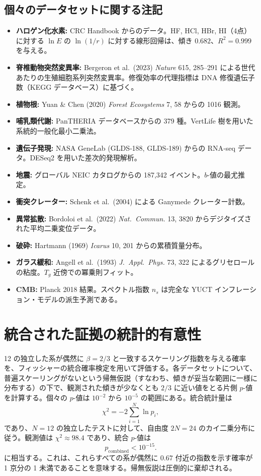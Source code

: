 \documentclass[11pt,a4paper]{article}
\begin{document}
	\subsection*{個々のデータセットに関する注記}
	\begin{itemize}
		\item \textbf{ハロゲン化水素:} CRC Handbook からのデータ。HF, HCl, HBr, HI（4点）に対する \(\ln E\) の \(\ln(1/r)\) に対する線形回帰は、傾き \(0.682\)、\(R^2=0.999\) を与える。
		\item \textbf{脊椎動物突然変異率:} Bergeron et al.\ (2023) \textit{Nature} 615, 285--291 による世代あたりの生殖細胞系列突然変異率。修復効率の代理指標は DNA 修復遺伝子数（KEGG データベース）に基づく。
		\item \textbf{植物根:} Yuan \& Chen (2020) \textit{Forest Ecosystems} 7, 58 からの 1016 観測。
		\item \textbf{哺乳類代謝:} PanTHERIA データベースからの 379 種。VertLife 樹を用いた系統的一般化最小二乗法。
		\item \textbf{遺伝子発現:} NASA GeneLab (GLDS‑188, GLDS‑189) からの RNA‑seq データ。DESeq2 を用いた差次的発現解析。
		\item \textbf{地震:} グローバル NEIC カタログからの 187,342 イベント。\(b\)-値の最尤推定。
		\item \textbf{衝突クレーター:} Schenk et al.\ (2004) による Ganymede クレーター計数。
		\item \textbf{異常拡散:} Bordoloi et al.\ (2022) \textit{Nat.\ Commun.} 13, 3820 からデジタイズされた平均二乗変位データ。
		\item \textbf{破砕:} Hartmann (1969) \textit{Icarus} 10, 201 からの累積質量分布。
		\item \textbf{ガラス緩和:} Angell et al.\ (1993) \textit{J.\ Appl.\ Phys.} 73, 322 によるグリセロールの粘度。\(T_g\) 近傍での冪乗則フィット。
		\item \textbf{CMB:} Planck 2018 結果。スペクトル指数 \(n_s\) は完全な YUCT インフレーション・モデルの派生予測である。
	\end{itemize}
	
	\section{統合された証拠の統計的有意性}
	
	12 の独立した系が偶然に \(\beta = 2/3\) と一致するスケーリング指数を与える確率を、フィッシャーの統合確率検定を用いて評価する。各データセットについて、普遍スケーリングがないという帰無仮説（すなわち、傾きが妥当な範囲に一様に分布する）の下で、観測された傾きが少なくとも \(2/3\) に近い値をとる片側 \(p\)-値を計算する。個々の \(p\)-値は \(10^{-2}\) から \(10^{-5}\) の範囲にある。統合統計量は
	\[
	\chi^2 = -2\sum_{i=1}^{N} \ln p_i,
	\]
	であり、\(N=12\) の独立したテストに対して、自由度 \(2N = 24\) のカイ二乗分布に従う。観測値は \(\chi^2 \approx 98.4\) であり、統合 \(p\)-値は
	\[
	p_{\mathrm{combined}} < 10^{-15}.
	\]
	に相当する。これは、これらすべての系が偶然に \(0.67\) 付近の指数を示す確率が 1 京分の 1 未満であることを意味する。帰無仮説は圧倒的に棄却される。
	
\end{document}
